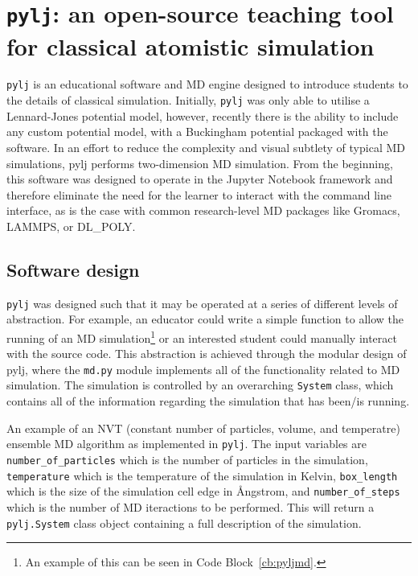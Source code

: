 \section{\texttt{pylj}: an open-source teaching tool for classical atomistic simulation}

\texttt{pylj} is an educational software and MD engine designed to introduce students to the details of classical simulation.
Initially, \texttt{pylj} was only able to utilise a Lennard-Jones potential model,\autocite{lennard-jones_determination_1924} however, recently\autocite{mccluskey_arm61/pylj_2018} there is the ability to include any custom potential model, with a Buckingham potential packaged with the software.\autocite{buckingham_classical_1938}
In an effort to reduce the complexity and visual subtlety of typical MD simulations, pylj performs two-dimension MD simulation.
From the beginning, this software was designed to operate in the Jupyter Notebook framework and therefore eliminate the need for the learner to interact with the command line interface, as is the case with common research-level MD packages like Gromacs, LAMMPS, or DL\_POLY.\autocite{berendsen_gromacs_1995,plimpton_fast_1995,smith_dl_poly_2002}

\subsection{Software design}
\texttt{pylj} was designed such that it may be operated at a series of different levels of abstraction.
For example, an educator could write a simple function to allow the running of an MD simulation\footnote{An example of this can be seen in Code Block~\ref{cb:pyljmd}.} or an interested student could manually interact with the source code.
This abstraction is achieved through the modular design of pylj, where the \texttt{md.py} module implements all of the functionality related to MD simulation.
The simulation is controlled by an overarching \texttt{System} class, which contains all of the information regarding the simulation that has been/is running.
%
\begin{listing}[t]
    \centering
    \caption{An example of an NVT (constant number of particles, volume, and temperatre) ensemble MD algorithm as implemented in \texttt{pylj}. The input variables are \texttt{number\_of\_particles} which is the number of particles in the simulation, \texttt{temperature} which is the temperature of the simulation in Kelvin, \texttt{box\_length} which is the size of the simulation cell edge in \AA ngstrom, and \texttt{number\_of\_steps} which is the number of MD iteractions to be performed. This will return a \texttt{pylj.System} class object containing a full description of the simulation.}
    
    \label{cb:pyljmd}
\end{listing}
%

